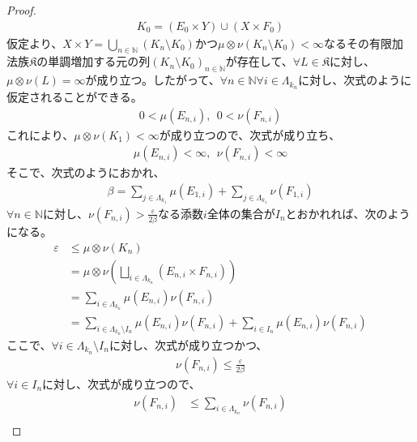 \documentclass[dvipdfmx]{jsarticle}
\begin{document}
\begin{proof}
\begin{align*}
K_{0} = \left( E_{0} \times Y \right) \cup \left( X \times F_{0} \right)
\end{align*}
仮定より、$X \times Y = \bigcup_{n \in \mathbb{N}} \left( K_{n} \setminus K_{0} \right)$かつ$\mu \otimes \nu\left( K_{n} \setminus K_{0} \right) < \infty$なるその有限加法族$\mathfrak{K}$の単調増加する元の列$\left( K_{n} \setminus K_{0} \right)_{n \in \mathbb{N}}$が存在して、$\forall L \in \mathfrak{K}$に対し、$\mu \otimes \nu(L) = \infty$が成り立つ。したがって、$\forall n \in \mathbb{N}\forall i \in \varLambda_{k_{n}}$に対し、次式のように仮定されることができる。
\begin{align*}
0 < \mu\left( E_{n,i} \right),\ \ 0 < \nu\left( F_{n,i} \right)
\end{align*}
これにより、$\mu \otimes \nu\left( K_{1} \right) < \infty$が成り立つので、次式が成り立ち、
\begin{align*}
\mu\left( E_{n,i} \right) < \infty,\ \ \nu\left( F_{n,i} \right) < \infty
\end{align*}
そこで、次式のようにおかれ、
\begin{align*}
\beta = \sum_{j \in \varLambda_{k_{1}}} {\mu\left( E_{1,i} \right)} + \sum_{j \in \varLambda_{k_{1}}} {\nu\left( F_{1,i} \right)}
\end{align*}
$\forall n \in \mathbb{N}$に対し、$\nu\left( F_{n,i} \right) > \frac{\varepsilon}{2\beta}$なる添数$i$全体の集合が$I_{n}$とおかれれば、次のようになる。
\begin{align*}
\varepsilon &\leq \mu \otimes \nu\left( K_{n} \right)\\
&= \mu \otimes \nu\left( \bigsqcup_{i \in \varLambda_{k_{n}}} \left( E_{n,i} \times F_{n,i} \right) \right)\\
&= \sum_{i \in \varLambda_{k_{n}}} {\mu\left( E_{n,i} \right)\nu\left( F_{n,i} \right)}\\
&= \sum_{i \in \varLambda_{k_{n}} \setminus I_{n}} {\mu\left( E_{n,i} \right)\nu\left( F_{n,i} \right)} + \sum_{i \in I_{n}} {\mu\left( E_{n,i} \right)\nu\left( F_{n,i} \right)}
\end{align*}
ここで、$\forall i \in \varLambda_{k_{n}} \setminus I_{n}$に対し、次式が成り立つかつ、
\begin{align*}
\nu\left( F_{n,i} \right) \leq \frac{\varepsilon}{2\beta}
\end{align*}
$\forall i \in I_{n}$に対し、次式が成り立つので、
\begin{align*}
\nu\left( F_{n,i} \right) &\leq \sum_{i \in \varLambda_{k_{n}}} {\nu\left( F_{n,i} \right)}\\

\end{align*}
\end{proof}
\end{document}
